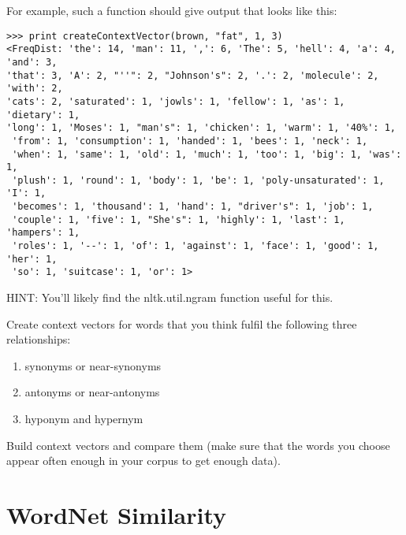 \documentclass[11pt,twoside]{article}
\begin{document}
For example, such a function should give output that looks like this:
\begin{verbatim}
>>> print createContextVector(brown, "fat", 1, 3)
<FreqDist: 'the': 14, 'man': 11, ',': 6, 'The': 5, 'hell': 4, 'a': 4, 'and': 3, 
'that': 3, 'A': 2, "''": 2, "Johnson's": 2, '.': 2, 'molecule': 2, 'with': 2, 
'cats': 2, 'saturated': 1, 'jowls': 1, 'fellow': 1, 'as': 1, 'dietary': 1, 
'long': 1, 'Moses': 1, "man's": 1, 'chicken': 1, 'warm': 1, '40%': 1,
 'from': 1, 'consumption': 1, 'handed': 1, 'bees': 1, 'neck': 1, 
 'when': 1, 'same': 1, 'old': 1, 'much': 1, 'too': 1, 'big': 1, 'was': 1, 
 'plush': 1, 'round': 1, 'body': 1, 'be': 1, 'poly-unsaturated': 1, 'I': 1, 
 'becomes': 1, 'thousand': 1, 'hand': 1, "driver's": 1, 'job': 1, 
 'couple': 1, 'five': 1, "She's": 1, 'highly': 1, 'last': 1, 'hampers': 1, 
 'roles': 1, '--': 1, 'of': 1, 'against': 1, 'face': 1, 'good': 1, 'her': 1, 
 'so': 1, 'suitcase': 1, 'or': 1>
\end{verbatim}

HINT: You'll likely find the nltk.util.ngram function useful for this.

Create context vectors for words that you think fulfil the following three relationships:
\begin{enumerate}
\item synonyms or near-synonyms
\item antonyms or near-antonyms
\item hyponym and hypernym
\end{enumerate}

Build context vectors and compare them (make sure that the words you choose appear often enough in your corpus to get enough data).

\section{WordNet Similarity} 
\end{document}
